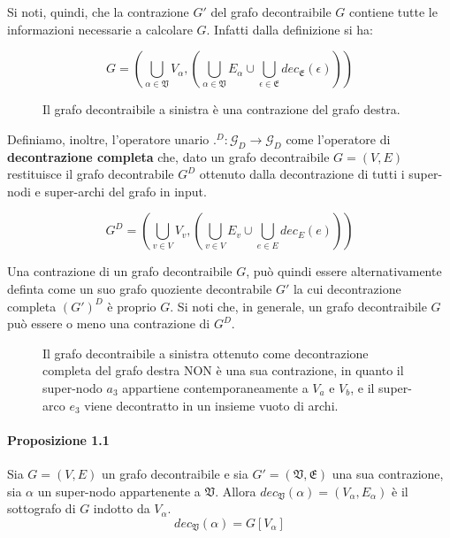     Si noti, quindi, che la contrazione $G'$ del grafo decontraibile $G$ contiene tutte le informazioni
    necessarie a calcolare $G$.
    Infatti dalla definizione si ha:

    \begin{equation*}
        G = (\bigcup_{\alpha \in \mathfrak{V}} V_\alpha , (\bigcup_{\alpha \in \mathfrak{V}} E_\alpha \cup \bigcup_{\epsilon \in \mathfrak{E}} dec_\mathfrak{E}(\epsilon)) )
    \end{equation*}

      \begin{figure}[H]
          \centering
          \caption{Il grafo decontraibile a sinistra \`e una contrazione del grafo destra.}
          \label{fig:example2}
      \end{figure}

    Definiamo, inoltre, l'operatore unario $.^D : \mathcal{G}_D \rightarrow \mathcal{G}_D$ come l'operatore di
    \textbf{decontrazione completa} che, dato un grafo decontraibile $G = (V, E)$ restituisce il grafo decontrabile
    $G^D$ ottenuto dalla decontrazione di tutti i super-nodi e super-archi del grafo in input.

    \begin{equation*}
        G^D = (\bigcup_{v \in V} V_v , (\bigcup_{v \in V} E_v \cup \bigcup_{e \in E} dec_E(e)) )
    \end{equation*}

    Una contrazione di un grafo decontraibile $G$, pu\`o quindi essere alternativamente definta come un suo grafo
    quoziente decontrabile $G'$ la cui decontrazione completa $(G')^D$ \`e proprio $G$.
    \newline
    Si noti che, in generale, un grafo decontraibile $G$ pu\`o essere o meno una contrazione di $G^D$.

\begin{figure}[H]
    \centering
    
    \caption{Il grafo decontraibile a sinistra ottenuto come decontrazione completa del grafo destra NON \`e una
    sua contrazione, in quanto il super-nodo $a_3$ appartiene contemporaneamente a $V_a$ e $V_b$,
        e il super-arco $e_3$ viene decontratto in un insieme vuoto di archi.}
    \label{fig:example3}
\end{figure}

    \paragraph{Proposizione 1.1}
    Sia $G=(V, E)$ un grafo decontraibile e sia $G\mathcal{'} = (\mathfrak{V}, \mathfrak{E})$ una sua contrazione,
    sia $\alpha$ un super-nodo appartenente a $\mathfrak{V}$.
    Allora $dec_{\mathfrak{V}}(\alpha) = (V_\alpha, E_\alpha)$ \`e il sottografo di $G$ indotto da $V_\alpha$.
    \begin{equation*}
        dec_{\mathfrak{V}}(\alpha) = G[V_\alpha]
    \end{equation*}

